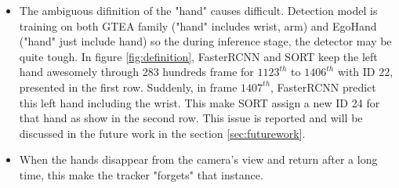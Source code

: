 \begin{itemize}
	\item The ambiguous  difinition of the "hand" causes difficult. Detection model is training on both GTEA family ("hand" includes wrist, arm) and EgoHand ("hand" just include hand) so the during inference stage, the detector may be quite tough. In figure \ref{fig:definition}, FasterRCNN and SORT keep the left hand awesomely through 283 hundreds frame for \(1123^{th}\) to \(1406^{th}\) with ID 22, presented in the first row. Suddenly, in frame \(1407^{th}\), FasterRCNN predict this left hand including the wrist. This make SORT assign a new ID 24 for that hand as show in the second row. This issue is reported and will be discussed in the future work in the section \ref{sec:futurework}.
	\item When the hands disappear from the camera’s view and return after a long time, this make the tracker "forgets" that instance.
\end{itemize}
